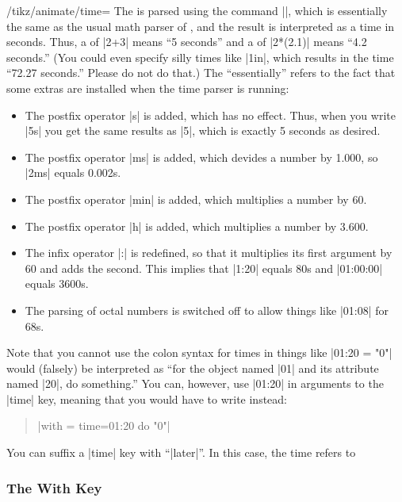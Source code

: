 \begin{key}{/tikz/animate/time=}
  The  is parsed using the command |\pgfparsetime|, which is
  essentially the same as the usual math parser of \tikzname, and the
  result is interpreted as a time in seconds. Thus, a  of |2+3|
  means ``5 seconds'' and a  of |2*(2.1)| means ``4.2
  seconds.'' (You could even specify silly times like |1in|, which
  results in the time ``72.27 seconds.'' Please do not do that.)
  The ``essentially''  refers to the fact that some extras are installed
  when the time parser is running:
  
  \begin{itemize}
  \item 
    The postfix operator |s| is added, which has no effect. Thus, when
    you write |5s| you get the same results as |5|, which is exactly 5
    seconds as desired.
  \item The postfix operator |ms| is added, which devides a number by
    1.000, so |2ms| equals 0.002s.
  \item
    The postfix operator |min| is added, which multiplies a number by
    60.
  \item The postfix operator |h| is added, which multiplies a number by
    3.600.
  \item The infix operator |:| is redefined, so that it multiplies its
    first argument by 60 and adds the second. This implies that
    |1:20| equals 80s and |01:00:00| equals 3600s. 
  \item The parsing of octal numbers is switched off to allow things
    like |01:08| for 68s. 
  \end{itemize}

  Note that you cannot use the colon syntax for times in things like
  |01:20 = "0"| would (falsely) be interpreted as ``for the object named
  |01| and its attribute named |20|, do something.'' You can, however,
  use |01:20| in arguments to the |time| key, meaning that you would
  have to write instead:
  \begin{quote}
    \normalfont
    |with = {time=01:20} do "0"|
  \end{quote}

  You can suffix a |time| key with ``|later|''. In this case, the time
  refers to 
\end{key}






\subsubsection{The With Key}
  



